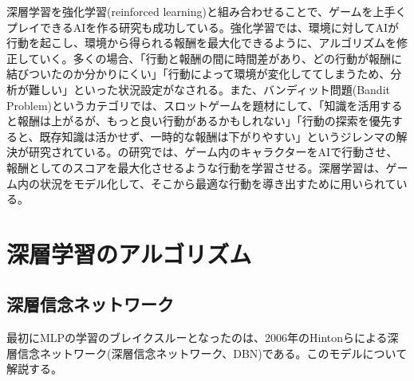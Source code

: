 深層学習を強化学習(reinforced learning)と組み合わせることで、ゲームを上手くプレイできるAIを作る研究も成功している\cite{mnih2013playing}。強化学習では、環境に対してAIが行動を起こし、環境から得られる報酬を最大化できるように、アルゴリズムを修正していく。多くの場合、「行動と報酬の間に時間差があり、どの行動が報酬に結びついたのか分かりにくい」「行動によって環境が変化しててしまうため、分析が難しい」といった状況設定がなされる。また、バンディット問題(Bandit Problem)というカテゴリでは、スロットゲームを題材にして、「知識を活用すると報酬は上がるが、もっと良い行動があるかもしれない」「行動の探索を優先すると、既存知識は活かせず、一時的な報酬は下がりやすい」というジレンマの解決が研究されている\cite{cesa-bianchi2013a-gang}。\cite{mnih2013playing}の研究では、ゲーム内のキャラクターをAIで行動させ、報酬としてのスコアを最大化させるような行動を学習させる。深層学習は、ゲーム内の状況をモデル化して、そこから最適な行動を導き出すために用いられている。

\section{深層学習のアルゴリズム}
\subsection{深層信念ネットワーク}
最初にMLPの学習のブレイクスルーとなったのは、2006年のHintonらによる深層信念ネットワーク(深層信念ネットワーク、DBN)\cite{hinton2006a-fast, hinton2006reducing}である。このモデルについて解説する。

